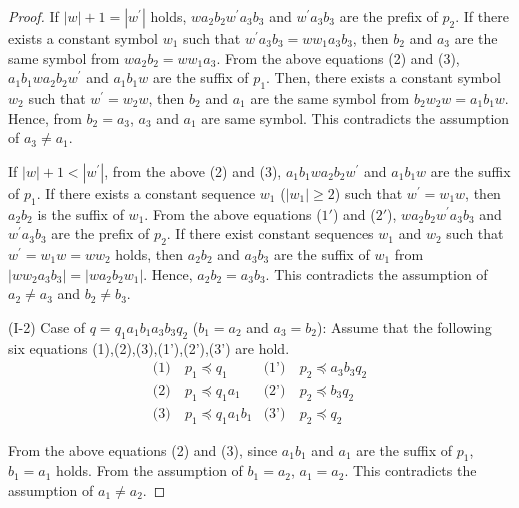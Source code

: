 \begin{proof}
If $|w|+1=|w^{\prime}|$ holds, $wa_{2}b_{2}w^{\prime}a_{3}b_{3}$ and $w^{\prime}a_{3}b_{3}$ are the prefix of $p_{2}$.
If there exists a constant symbol $w_{1}$ such that $w^{\prime}a_{3}b_{3}=ww_{1}a_{3}b_{3}$,
then $b_{2}$ and $a_{3}$ are the same symbol from $wa_{2}b_{2}=ww_{1}a_{3}$.
From the above equations (2) and (3), $a_{1}b_{1}wa_{2}b_{2}w^{\prime}$ and $a_{1}b_{1}w$ are the suffix of $p_{1}$.
Then, there exists a constant symbol $w_{2}$ such that $w^{\prime}=w_{2}w$,
then $b_{2}$ and $a_{1}$ are the same symbol from $b_{2}w_{2}w=a_{1}b_{1}w$.
Hence, from $b_{2}=a_{3}$, $a_{3}$ and $a_{1}$ are same symbol.
This contradicts the assumption of $a_{3} \ne a_{1}$.

If $|w|+1 < |w^{\prime}|$, from the above (2) and (3), 
$a_{1}b_{1}wa_{2}b_{2}w^{\prime}$ and $a_{1}b_{1}w$ are the suffix of $p_{1}$.
If there exists a constant sequence $w_{1}$ ($|w_{1}|\geq 2$) such that $w^{\prime}=w_{1}w$, then $a_{2}b_{2}$ is the suffix of $w_{1}$.
From  the above equations ($1'$) and ($2'$), 
$wa_{2}b_{2}w^{\prime}a_{3}b_{3}$ and $w^{\prime}a_{3}b_{3}$ are the prefix of $p_{2}$.
If there exist constant sequences $w_{1}$ and $w_{2}$ such that $w^{\prime} = w_{1}w=ww_{2}$ holds, then $a_{2}b_{2}$ and $a_{3}b_{3}$ are the suffix of $w_{1}$ from $|ww_{2}a_{3}b_{3}|=|wa_{2}b_{2}w_{1}|$.
Hence, $a_{2}b_{2}=a_{3}b_{3}$.
This contradicts the assumption of $a_{2} \ne a_{3}$ and $b_{2} \ne b_{3}$.
\smallskip

\noindent
(I-2) Case of $q=q_{1}a_{1}b_{1}a_{3}b_{3}q_{2}$ ($b_{1}=a_{2}$ and $a_{3}=b_{2}$):
Assume that the following six equations (1),(2),(3),(1'),(2'),(3') are hold.
\begin{align*}
\textrm{(1)}~& p_{1} \preceq q_{1} & \textrm{(1')}~& p_{2} \preceq a_{3}b_{3}q_{2} \\
\textrm{(2)}~& p_{1} \preceq q_{1}a_{1} & \textrm{(2')}~& p_{2} \preceq b_{3}q_{2} \\
\textrm{(3)}~& p_{1} \preceq q_{1}a_{1}b_{1} & \textrm{(3')}~& p_{2} \preceq q_{2}
\end{align*}

\noindent
From the above equations (2) and (3), since $a_{1}b_{1}$ and $a_{1}$ are the suffix of $p_{1}$, 
$b_{1} = a_{1}$ holds.
From the assumption of $b_{1}=a_{2}$, $a_{1}=a_{2}$.
This contradicts the assumption of $a_{1}\not= a_{2}$.
\smallskip


\end{proof}
